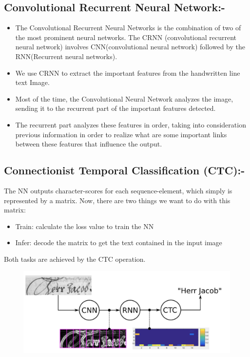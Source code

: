\subsection{Convolutional Recurrent Neural Network:-}
\begin{itemize}
\item The Convolutional Recurrent Neural Networks is the combination of two of the most prominent neural networks. The CRNN (convolutional recurrent neural network) involves CNN(convolutional neural network) followed by the RNN(Recurrent neural networks).
\item We use CRNN to extract the important features from the handwritten line text Image.
\item Most of the time, the Convolutional Neural Network analyzes the image, sending it to the recurrent part of the important features detected.
\item The recurrent part analyzes these features in order, taking into consideration previous information in order to realize what are some important links between these features that influence the output.
\end{itemize}

\subsection{Connectionist Temporal Classification (CTC):-}
The NN outputs character-scores for each sequence-element, which simply is represented by a matrix. Now, there are two things we want to do with this matrix:
\begin{itemize}
\item Train: calculate the loss value to train the NN
\item Infer: decode the matrix to get the text contained in the input image
\end{itemize}
Both tasks are achieved by the CTC operation.

\begin{figure}[H]
    \centering
    \includegraphics[width=150mm]{figures/image3.png}
\end{figure}

